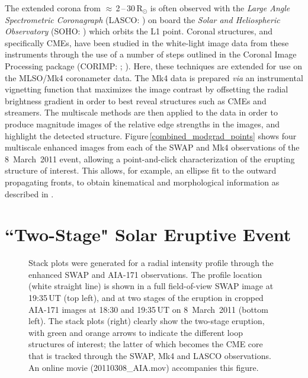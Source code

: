 \documentclass[namedreferences]{solarphysics}
\begin{document}
\begin{article}
The extended corona from $\approx$\,2\,--\,30\,R$_{\odot}$ is often observed with the \emph{Large Angle Spectrometric Coronagraph} (LASCO: )  on board the \emph{Solar and Heliospheric Observatory} (SOHO: ) which orbits the L1 point. Coronal structures, and specifically CMEs, have been studied in the white-light image data from these instruments through the use of a number of steps outlined in the Coronal Image Processing package (CORIMP: ; ). Here, these techniques are extended for use on the MLSO/Mk4 coronameter data. The Mk4 data is prepared \emph{via} an instrumental vignetting function that maximizes the image contrast by offsetting the radial brightness gradient in order to best reveal structures such as CMEs and streamers. The multiscale methods are then applied to the data in order to produce magnitude images of the relative edge strengths in the images, and highlight the detected structure. Figure\,\ref{combined_modgrad_points} shows four multiscale enhanced images from each of the SWAP and Mk4 observations of the 8~March~2011 event, allowing a point-and-click characterization of the erupting structure of interest. This allows, for example, an ellipse fit to the outward propagating fronts, to obtain kinematical and morphological information as described in .



\section{``Two-Stage" Solar Eruptive Event}
\label{sect:event}

\begin{figure}[t]
\caption{Stack plots were generated for a radial intensity profile through the enhanced SWAP and AIA-171 observations. The profile location (white straight line) is shown in a full field-of-view SWAP image at 19:35\,UT (top left), and at two stages of the eruption in cropped AIA-171 images at 18:30 and 19:35\,UT on 8~March~2011 (bottom left). The stack plots (right) clearly show the two-stage eruption, with green and orange arrows to indicate the different loop structures of interest; the latter of which becomes the CME core that is tracked through the SWAP, Mk4 and LASCO observations. An online movie (20110308\_AIA.mov) accompanies this figure.}
\label{stackplots}
\end{figure}


\end{article}
\end{document}
